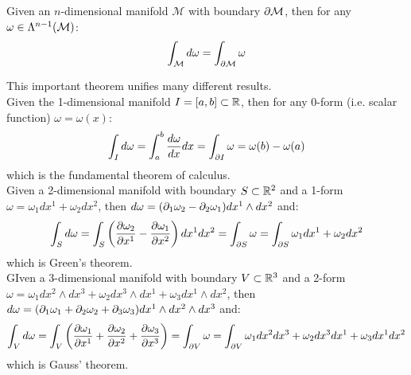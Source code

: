 \begin{theorem}[Stokes]
  Given an $ n $-dimensional manifold $ \mathcal{M} $ with boundary $ \partial \mathcal{M} $, then for any $ \omega \in\Lambda^{n-1}(\mathcal{M}) $:
  \begin{equation}
    \int_{\mathcal{M}} d\omega = \int_{\partial \mathcal{M}} \omega
    \label{eq:2.48}
  \end{equation}
\end{theorem}

This important theorem unifies many different results.\\
Given the 1-dimensional manifold $ I = [a,b] \subset \mathbb{R} $, then for any $ 0 $-form (i.e. scalar function) $ \omega = \omega(x) $:
\begin{equation*}
  \int_{I} d\omega = \int_a^b \frac{d\omega}{dx} dx = \int_{\partial I} \omega = \omega(b) - \omega(a)
\end{equation*}
which is the fundamental theorem of calculus.\\
Given a 2-dimensional manifold with boundary $ S \subset \mathbb{R}^2 $ and a 1-form $ \omega = \omega_1 dx^1 + \omega_2 dx^2 $, then $ d\omega = (\partial_1 \omega_2 - \partial_2 \omega_1) dx^1 \wedge dx^2 $ and:
\begin{equation*}
  \int_{S} d\omega = \int_{S} \left( \frac{\partial \omega_2}{\partial x^1} - \frac{\partial \omega_1}{\partial x^2} \right) dx^1 dx^2 = \int_{\partial S} \omega = \int_{\partial S} \omega_1 dx^1 + \omega_2 dx^2
\end{equation*}
which is Green's theorem.\\
GIven a 3-dimensional manifold with boundary $ V \subset \mathbb{R}^3 $ and a 2-form $ \omega = \omega_1 dx^2 \wedge dx^3 + \omega_2 dx^3 \wedge dx^1 + \omega_3 dx^1 \wedge dx^2 $, then $ d\omega = (\partial_1 \omega_1 + \partial_2 \omega_2 + \partial_3 \omega_3) dx^1 \wedge dx^2 \wedge dx^3 $ and:
\begin{equation*}
  \int_{V} d\omega = \int_{V} \left( \frac{\partial \omega_1}{\partial x^1} + \frac{\partial \omega_2}{\partial x^2} + \frac{\partial \omega_3}{\partial x^3} \right) = \int_{\partial V} \omega = \int_{\partial V} \omega_1 dx^2 dx^3 + \omega_2 dx^3 dx^1 + \omega_3 dx^1 dx^2
\end{equation*}
which is Gauss' theorem.










